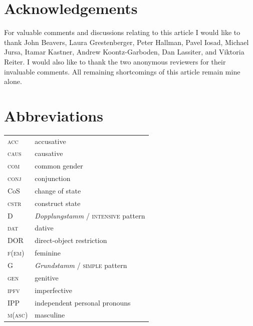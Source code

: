 \documentclass[output=paper,colorlinks,citecolor=brown]{langscibook}
\begin{document}
\section*{Acknowledgements}

For valuable comments and discussions relating to this article I would like to thank John Beavers,  Laura Grestenberger, Peter Hallman,  Pavel Iosad, Michael Jursa, Itamar Kastner, Andrew Koontz-Garboden, Dan Lassiter,  and Viktoria Reiter. I would also like to thank the two anonymous reviewers for their invaluable comments. All remaining shortcomings of this article remain mine alone.
 
 
\section*{Abbreviations}
\begin{tabularx}{.5\textwidth}{lQ}
    \textsc{acc} & accusative  \\
    \textsc{caus} & causative \\
    \textsc{com} & common gender  \\
    \textsc{conj} & conjunction  \\
    CoS & change of state  \\
    \textsc{cstr} & construct state  \\
    D & \emph{Dopplungstamm} / \textsc{intensive} pattern  \\
    \textsc{dat} & dative  \\
    DOR & direct-object restriction \\
    \textsc{f(em)} & feminine  \\
    G & \emph{Grundstamm} / \textsc{simple} pattern  \\
    \textsc{gen} & genitive  \\
    \textsc{ipfv} & imperfective \\
     IPP & independent personal pronouns\\
         \textsc{m(asc)} & masculine \\
\end{tabularx}
\end{document}
